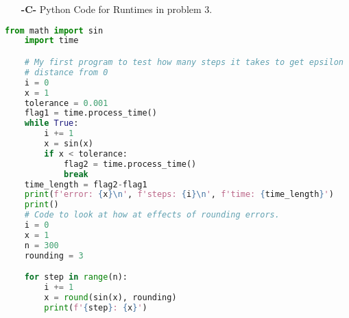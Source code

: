\documentclass[11pt]{article}
\theoremstyle{definition}
\newcommand{\1}[1]{\mathbf{1} \left \{ #1 \right \}}
\begin{document}
\begin{itemize}
    \item[{\textbf{-C-}}] Python Code for Runtimes in problem 3.
\end{itemize}
\begin{lstlisting}[language=Python]
    from math import sin
    import time

    # My first program to test how many steps it takes to get epsilon
    # distance from 0
    i = 0
    x = 1
    tolerance = 0.001
    flag1 = time.process_time()
    while True:
        i += 1
        x = sin(x)
        if x < tolerance:
            flag2 = time.process_time()
            break
    time_length = flag2-flag1
    print(f'error: {x}\n', f'steps: {i}\n', f'time: {time_length}')
    print()
    # Code to look at how at effects of rounding errors.
    i = 0
    x = 1
    n = 300
    rounding = 3

    for step in range(n):
        i += 1
        x = round(sin(x), rounding)
        print(f'{step}: {x}')
\end{lstlisting}
\end{document}
